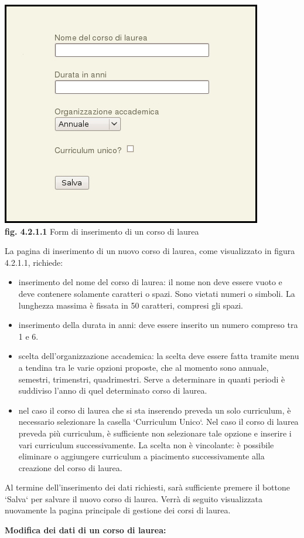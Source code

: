 \documentclass[11pt,a4paper]{article}
\begin{document}
\begin{center}
	\includegraphics[scale=0.5]{images/nuovo_corso.jpg}\\
	\textbf{fig. 4.2.1.1} Form di inserimento di un corso di laurea\\
\end{center}

La pagina di inserimento di un nuovo corso di laurea, come visualizzato in figura 4.2.1.1, richiede:
\begin{itemize}
 \item inserimento del nome del corso di laurea: il nome non deve essere vuoto e deve contenere solamente caratteri o spazi. Sono vietati numeri o simboli. La lunghezza massima è fissata in 50 caratteri, compresi gli spazi.
 \item inserimento della durata in anni: deve essere inserito un numero compreso tra 1 e 6.
 \item scelta dell'organizzazione accademica: la scelta deve essere fatta tramite menu a tendina tra le varie opzioni proposte, che al momento sono annuale, semestri, trimenstri, quadrimestri. Serve a determinare in quanti periodi è suddiviso l'anno di quel determinato corso di laurea.
 \item nel caso il corso di laurea che si sta inserendo preveda un solo curriculum, è necessario selezionare la casella `Curriculum Unico`. Nel caso il corso di laurea preveda più curriculum, è sufficiente non selezionare tale opzione e inserire i vari curriculum successivamente. La scelta non è vincolante: è possibile eliminare o aggiungere curriculum a piacimento successivamente alla creazione del corso di laurea.
\end{itemize}
Al termine dell'inserimento dei dati richiesti, sarà sufficiente premere il bottone `Salva` per salvare il nuovo corso di laurea. Verrà di seguito visualizzata nuovamente la pagina principale di gestione dei corsi di laurea. 
\newpage
\begin{large}\textbf{Modifica dei dati di un corso di laurea:}\end{large}
\end{document}
